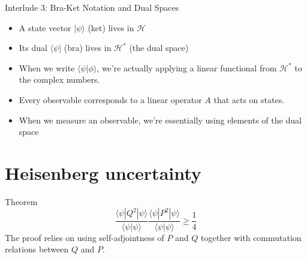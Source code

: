 \documentclass[12pt]{beamer}
\begin{document}
\begin{frame}{Interlude 3: Bra-Ket Notation and Dual Spaces}
\begin{itemize}
	\item A state vector $|\psi\rangle$ (ket) lives in $\mathcal{H}$
	\item Its dual $\langle \psi|$ (bra) lives in $\mathcal{H}^{*}$ (the dual space)
	\item When we write $\langle \psi|\phi\rangle$, we're actually applying a linear functional from $\mathcal{H}^{*}$ to the complex numbers.
	\item Every observable corresponds to a linear operator $A$ that acts on states. 
	\item When we measure an observable, we're essentially using elements of the dual space
\end{itemize}
\end{frame}
\section{Heisenberg uncertainty}
\begin{frame}{Theorem}
\begin{displaymath}
  \frac{\langle\psi|Q^2|\psi\rangle}{\langle\psi|\psi\rangle}\frac{\langle\psi|P^2|\psi\rangle}{\langle\psi|\psi\rangle}\geq\frac{1}{4}
\end{displaymath}
The proof relies on using self-adjointness of $P$ and $Q$ together with commutation relations between $Q$ and $P$.
\end{frame}
\end{document}
